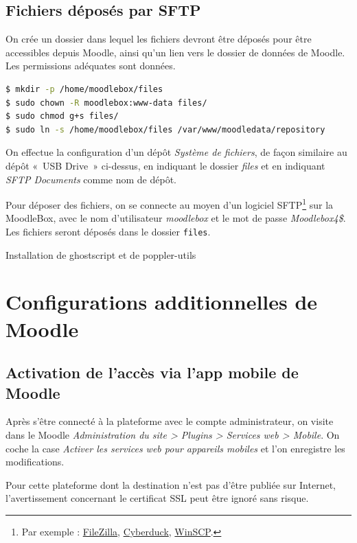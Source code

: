 \documentclass[12pt]{article}
\begin{document}
\subsection{Fichiers déposés par SFTP}

On crée un dossier dans lequel les fichiers devront être déposés pour être accessibles depuis Moodle, ainsi qu'un lien vers le dossier de données de Moodle.
Les permissions adéquates sont données.

\begin{lstlisting}[language=bash]
$ mkdir -p /home/moodlebox/files
$ sudo chown -R moodlebox:www-data files/
$ sudo chmod g+s files/
$ sudo ln -s /home/moodlebox/files /var/www/moodledata/repository
\end{lstlisting}

On effectue la configuration d'un dépôt \emph{Système de fichiers}, de façon similaire au dépôt « USB Drive » ci-dessus, en indiquant le dossier \emph{files} et en indiquant \emph{SFTP Documents} comme nom de dépôt.

Pour déposer des fichiers, on se connecte au moyen d'un logiciel SFTP\footnote{Par exemple : \href{https://filezilla-project.org/}{FileZilla}, \href{https://cyberduck.io/}{Cyberduck}, \href{http://winscp.net/}{WinSCP}.} sur la MoodleBox, avec le nom d'utilisateur \emph{moodlebox} et le mot de passe \emph{Moodlebox4\$}.
Les fichiers seront déposés dans le dossier \lstinline{files}.

Installation de ghostscript et de poppler-utils

\section{Configurations additionnelles de Moodle}

\subsection{Activation de l'accès via l'app mobile de Moodle}

Après s'être connecté à la plateforme avec le compte administrateur,  on visite dans le Moodle \emph{Administration du site > Plugins > Services web > Mobile}.
On coche la case \emph{Activer les services web pour appareils mobiles} et l'on enregistre les modifications.

Pour cette plateforme dont la destination n'est pas d'être publiée sur Internet, l'avertissement concernant le certificat SSL peut être ignoré sans risque.
\end{document}
